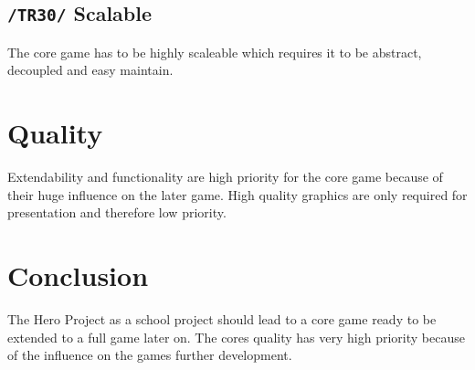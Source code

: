 \documentclass[11pt]{article}
\begin{document}
\subsection{\texttt{/TR30/} Scalable}
The core game has to be highly scaleable which requires it to be abstract, decoupled and easy maintain.

\section{Quality}
Extendability and functionality are high priority for the core game because of their huge influence on the later game.
High quality graphics are only required for presentation and therefore low priority.

\section{Conclusion}
The Hero Project as a school project should lead to a core game ready to be extended to a full game later on.
The cores quality has very high priority because of the influence on the games further development.
\end{document}
